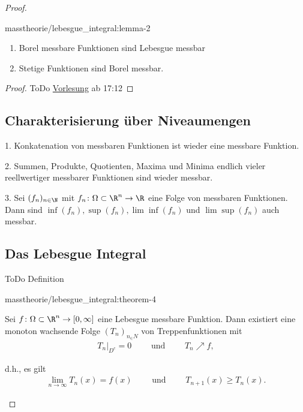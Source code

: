 \documentclass[letterpaper,10pt,english]{jupyterBook}
\begin{document}
\begin{proof}
\begin{lemma}{}{masstheorie/lebesgue_integral:lemma-2}
\begin{enumerate}

\item {} 
\par
Borel messbare Funktionen sind Lebesgue messbar

\item {} 
\par
Stetige Funktionen sind Borel messbar.

\end{enumerate}
\end{lemma}

\begin{proof}
 ToDo
\href{https://www.fau.tv/clip/id/40563}{Vorlesung} ab 17:12
\end{proof}


\subsection{Charakterisierung über Niveaumengen}
\begin{remark}{}{}\label{masstheorie/lebesgue_integral:remark-3}



\par
1. Konkatenation von messbaren Funktionen ist wieder eine messbare Funktion.

\par
2. Summen, Produkte, Quotienten, Maxima und Minima endlich vieler reellwertiger messbarer Funktionen sind wieder messbar.

\par
3. Sei \((f_n)_{n \in \N}\) mit \(f_n \colon \Omega \subset \R^n \rightarrow \R\) eine Folge von messbaren Funktionen.
Dann sind \(\inf(f_n), \sup(f_n), \lim\inf (f_n)\) und \(\lim\sup (f_n)\) auch messbar.
\end{remark}


\subsection{Das Lebesgue Integral}
\label{\detokenize{masstheorie/lebesgue_integral:das-lebesgue-integral}}
\par
ToDo Definition
\begin{theorem}{}{masstheorie/lebesgue_integral:theorem-4}



\par
Sei \(f \colon \Omega \subset \R^n \rightarrow [0,\infty]\) eine Lebesgue messbare Funktion.
Dann existiert eine monoton wachsende Folge \((T_n)_{n_\in N}\) von Treppenfunktionen mit
\begin{align*}
T_n|_{D^c} = 0 \qquad \text{ und } \qquad T_n \nearrow f,
\end{align*}
\par
d.h., es gilt
\begin{align*}
\lim_{n\rightarrow \infty} T_n(x) = f(x) \qquad \text{ und } \qquad T_{n+1}(x) \geq T_n(x).
\end{align*}\end{theorem}


\end{proof}
\end{document}
